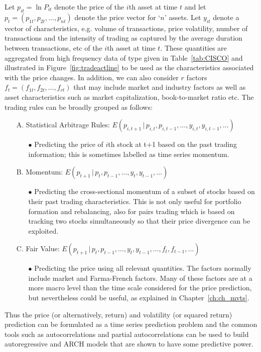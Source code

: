 Let $p_{it}= \ln P_{it}$ denote the price of the $i$th asset at time $t$ and let $p_t = (p_{1t}, p_{2t}, \ldots, p_{nt})$ denote the price vector for `$n$' assets. Let $y_{it}$ denote a vector of characteristics, e.g. volume of transactions, price volatility, number of transactions and the intensity of trading as captured by the average duration between transactions, etc of the $i$th asset at time $t$. These quantities are aggregated from high frequency data of type given in Table~\ref{tab:CISCO} and illustrated in Figure~\ref{fig:tradeactline} to be used as the characteristics associated with the price changes. In addition, we can also consider $r$ factors $f_t = (f_{1t}, f_{2t}, \ldots, f_{rt})$ that may include market and industry factors as well as asset characteristics such as market capitalization, book-to-market ratio etc. The trading rules can be broadly grouped as follows:
        \begin{itemize}
        \item[A.] Statistical Arbitrage Rules: $E(p_{i,t+1}\,|\,p_{i,t},p_{i,t-1},\ldots,y_{i,t},y_{i,t-1},\ldots)$
        \begin{itemize}
        \item[$\bullet$] Predicting the price of $i$th stock at t+1 based on the past trading information; this is sometimes labelled as time series momentum.
        \end{itemize}
        \item[B.] Momentum: $E(p_{t+1}\,|\,p_{t},p_{t-1},\ldots,y_{t},y_{t-1},\ldots)$
        \begin{itemize}
        \item[$\bullet$] Predicting the cross-sectional momentum of a subset of stocks based on their past trading characteristics. This is not only useful for portfolio formation and rebalancing, also for pairs trading which is based on tracking two stocks simultaneously so that their price divergence can be exploited. 
        \end{itemize}
        \item[C.] Fair Value: $E(p_{t+1}\,|\,p_{t},p_{t-1},\ldots,y_{t},y_{t-1},\ldots,f_t,f_{t-1},\ldots)$
        \begin{itemize}
        \item[$\bullet$] Predicting the price using all relevant quantities. The factors normally include market and Farma-French factors. Many of these factors are at a more macro level than the time scale considered for the price prediction, but nevertheless could be useful, as explained in Chapter~\ref{ch:ch_mvts}.
        \end{itemize}
        \end{itemize}
\noindent Thus the price (or alternatively, return) and volatility (or squared return) prediction can be formulated as a time series prediction problem and the common tools such as autocorrelations and partial autocorrelations can be used to build autoregressive and ARCH models that are shown to have some predictive power. 


